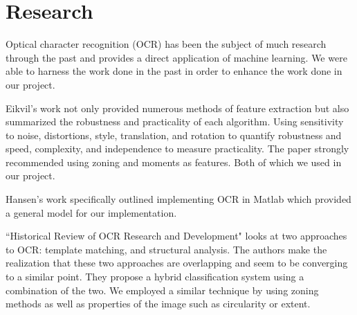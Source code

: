 \section{Research}

Optical character recognition (OCR) has been the subject of much research through the past and provides a direct application of machine learning. We were able to harness the work done in the past in order to enhance the work done in our project. 

Eikvil's work \cite{one} not only provided numerous methods of feature extraction but also summarized the robustness and practicality of each algorithm. Using sensitivity to noise, distortions, style, translation, and rotation to quantify robustness and speed, complexity, and independence to measure practicality. The paper strongly recommended using zoning and moments as features. Both of which we used in our project.

Hansen's work \cite{two} specifically outlined implementing OCR in Matlab which provided a general model for our implementation.

``Historical Review of OCR Research and Development" \cite{three} looks at two approaches to OCR: template matching, and structural analysis. The authors make the realization that these two approaches are overlapping and seem to be converging to a similar point. They propose a hybrid classification system using a combination of the two. We employed a similar technique by using zoning methods as well as properties of the image such as circularity or extent.